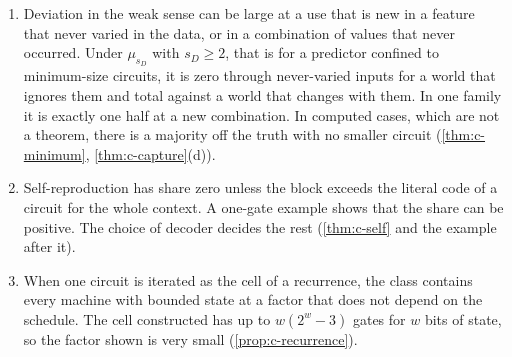 \begin{enumerate}[label=\arabic*.,leftmargin=2em,itemsep=0pt,topsep=2pt]
it imitates weigh at most one description of such a world (\cref{thm:c-refund}(e)). There is no cap on
triggers entangled with the honest computation, and none on the deviating mass at a use beyond
\cref{thm:c-transfer}(d) and \cref{thm:c-floor}(d).
\item Deviation in the weak sense can be large at a use that is new in a feature that never varied in the
data, or in a combination of values that never occurred. Under $\mu_{s_D}$ with $s_D\ge2$, that is for a
predictor confined to minimum-size circuits, it is zero through never-varied inputs for a world that ignores
them and total against a world that changes with them. In one family it is exactly one half at a new
combination. In computed cases, which are not a theorem, there is a majority off the truth with no smaller
circuit (\cref{thm:c-minimum}, \cref{thm:c-capture}(d)).
\item Self-reproduction has share zero unless the block exceeds the literal code of a circuit for the whole
context. A one-gate example shows that the share can be positive. The choice of decoder decides the rest
(\cref{thm:c-self} and the example after it).
\item When one circuit is iterated as the cell of a recurrence, the class contains every machine with bounded
state at a factor that does not depend on the schedule. The cell constructed has up to $w(2^w-3)$ gates for
$w$ bits of state, so the factor shown is very small (\cref{prop:c-recurrence}).
\end{enumerate}

